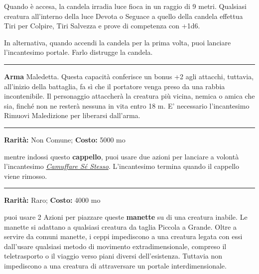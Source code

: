 \begin{multicols}{2}
Quando è accesa, la candela irradia luce fioca in un raggio di 9 metri. Qualsiasi creatura all'interno della luce Devota o Seguace a quello della candela effettua Tiri per Colpire, Tiri Salvezza e prove di competenza con +1d6.

In alternativa, quando accendi la candela per la prima volta, puoi lanciare l'incantesimo portale. Farlo distrugge la candela.

\smallskip\noindent\rule{\linewidth}{2pt}  \hypertarget{Caos}{}\smallskip{}\noindent\label{Caos}

\textbf{Arma} Maledetta. Questa capacità conferisce un bonus +2 agli attacchi, tuttavia, all'inizio della battaglia, fa sì che il portatore venga preso da una rabbia incontenibile. Il personaggio attaccherà la creatura più vicina, nemica o amica che sia, finché non ne resterà nessuna in vita entro 18 m. E' necessario l'incantesimo Rimuovi Maledizione per liberarsi dall'arma.

\smallskip\noindent\rule{\linewidth}{2pt}  \hypertarget{CappellodelCamuffamento}{}\smallskip{}\noindent\label{CappellodelCamuffamento}

\textbf{Rarità:} Non Comune; \textbf{Costo:} 5000 mo

mentre indossi questo \textbf{cappello}, puoi usare due azioni per lanciare a volontà l'incantesimo \emph{\hyperlink{Camuffare Sé Stesso}{Camuffare Sé Stesso}}. L'incantesimo termina quando il cappello viene rimosso.

\smallskip\noindent\rule{\linewidth}{2pt}  \hypertarget{CeppiDimensionali}{}\smallskip{}\noindent\label{CeppiDimensionali}

\textbf{Rarità:} Raro; \textbf{Costo:} 4000 mo

puoi usare 2 Azioni per piazzare queste \textbf{manette} su di una creatura inabile. Le manette si adattano a qualsiasi creatura da taglia Piccola a Grande. Oltre a servire da comuni manette, i ceppi impediscono a una creatura legata con essi dall'usare qualsiasi metodo di movimento extradimensionale, compreso il teletrasporto o il viaggio verso piani diversi dell'esistenza. Tuttavia non impediscono a una creatura di attraversare un portale interdimensionale.


\end{multicols}
